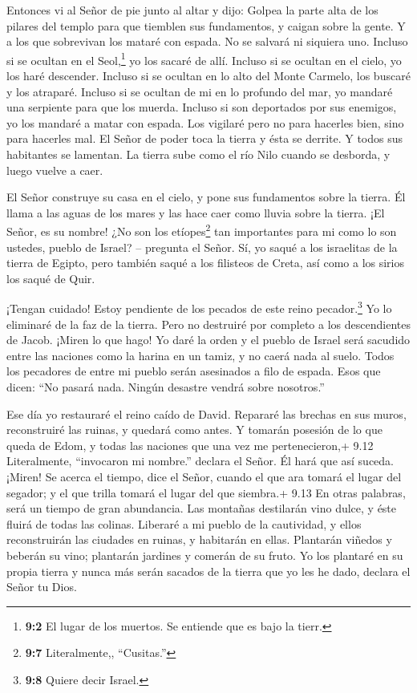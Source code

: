  Entonces vi al Señor de pie junto al altar y dijo: Golpea
la parte alta de los pilares del templo para que tiemblen sus
fundamentos, y caigan sobre la gente. Y a los que sobrevivan los mataré
con espada. No se salvará ni siquiera uno.  Incluso si se
ocultan en el Seol,\footnote{\textbf{9:2} El lugar de los muertos. Se
  entiende que es bajo la tierr.} yo los sacaré de allí. Incluso si se
ocultan en el cielo, yo los haré descender.  Incluso si se
ocultan en lo alto del Monte Carmelo, los buscaré y los atraparé.
Incluso si se ocultan de mi en lo profundo del mar, yo mandaré una
serpiente para que los muerda.  Incluso si son deportados
por sus enemigos, yo los mandaré a matar con espada. Los vigilaré pero
no para hacerles bien, sino para hacerles mal.  El Señor de
poder toca la tierra y ésta se derrite. Y todos sus habitantes se
lamentan. La tierra sube como el río Nilo cuando se desborda, y luego
vuelve a caer.

 El Señor construye su casa en el cielo, y pone sus
fundamentos sobre la tierra. Él llama a las aguas de los mares y las
hace caer como lluvia sobre la tierra. ¡El Señor, es su nombre!
 ¿No son los etíopes\footnote{\textbf{9:7} Literalmente,,
  ``Cusitas.''} tan importantes para mi como lo son ustedes, pueblo de
Israel? -- pregunta el Señor. Sí, yo saqué a los israelitas de la tierra
de Egipto, pero también saqué a los filisteos de Creta, así como a los
sirios los saqué de Quir.

 ¡Tengan cuidado! Estoy pendiente de los pecados de este
reino pecador.\footnote{\textbf{9:8} Quiere decir Israel.} Yo lo
eliminaré de la faz de la tierra. Pero no destruiré por completo a los
descendientes de Jacob.  ¡Miren lo que hago! Yo daré la
orden y el pueblo de Israel será sacudido entre las naciones como la
harina en un tamiz, y no caerá nada al suelo.  Todos los
pecadores de entre mi pueblo serán asesinados a filo de espada. Esos que
dicen: ``No pasará nada. Ningún desastre vendrá sobre nosotros.''

 Ese día yo restauraré el reino caído de David. Repararé
las brechas en sus muros, reconstruiré las ruinas, y quedará como antes.
 Y tomarán posesión de lo que queda de Edom, y todas las
naciones que una vez me pertenecieron,+ 9.12 Literalmente, ``invocaron
mi nombre.'' declara el Señor. Él hará que así suceda. 
¡Miren! Se acerca el tiempo, dice el Señor, cuando el que ara tomará el
lugar del segador; y el que trilla tomará el lugar del que siembra.+
9.13 En otras palabras, será un tiempo de gran abundancia. Las montañas
destilarán vino dulce, y éste fluirá de todas las colinas. 
Liberaré a mi pueblo de la cautividad, y ellos reconstruirán las
ciudades en ruinas, y habitarán en ellas. Plantarán viñedos y beberán su
vino; plantarán jardines y comerán de su fruto.  Yo los
plantaré en su propia tierra y nunca más serán sacados de la tierra que
yo les he dado, declara el Señor tu Dios.
